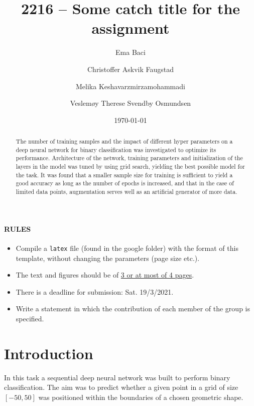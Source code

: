 \documentclass[prl,twocolumn]{revtex4-1}
\begin{document}
\title{2216 -- Some catch title for the assignment}



\author{Ema Baci}
\author{Christoffer Askvik Faugstad}
\author{Melika Keshavarzmirzamohammadi}
\author{Veslemøy Therese Svendby Osmundsen}

\date{\today}


\begin{abstract}
The number of training samples and the impact of different hyper parameters on a deep neural network for binary classification was investigated to optimize its performance. Architecture of the network, training parameters and initialization of the layers in the model was tuned by using grid search, yielding the best possible model for the task. It was found that a smaller sample size for training is sufficient to yield a good accuracy as long as the number of epochs is increased, and that in the case of limited data points, augmentation serves well as an artificial generator of more data.
\end{abstract}

\maketitle


\paragraph{\bf RULES}
{
\bf
\begin{itemize}
\item Compile a {\tt latex} file (found in the google folder) with the format of this template,  without changing the parameters (page size etc.).
\item The text and figures should be of \underline{3 or at most of 4 pages}.
\item There is a deadline for submission: Sat. 19/3/2021.
\item Write a statement in which the contribution of each member of the group is specified.
\end{itemize}
}

\section{Introduction}
In this task a sequential deep neural network was built to perform binary classification. The aim was to predict whether a given point in a grid of size $\left[-50,50\right]$ was positioned within the boundaries of a chosen geometric shape.
\end{document}
